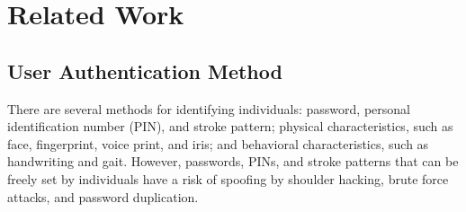 \documentclass[sigconf,authordraft]{acmart}
\begin{document}



\section{Related Work}
\label{sec:related}

\subsection{User Authentication Method}
There are several methods for identifying individuals: password, personal identification number (PIN), and stroke pattern; physical characteristics, such as face, fingerprint, voice print, and iris; and behavioral characteristics, such as handwriting and gait. However, passwords, PINs, and stroke patterns that can be freely set by individuals have a risk of spoofing by shoulder hacking, brute force attacks, and password duplication.\par
\end{document}
